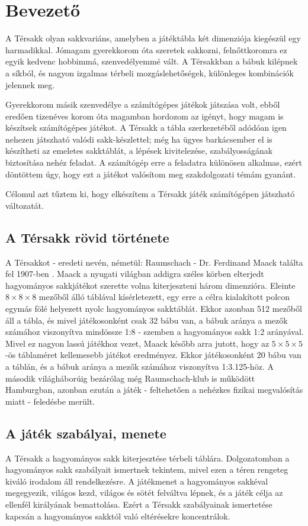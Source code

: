\documentclass[12pt, twoside]{report}
\begin{document}
\tableofcontents

\chapter{Bevezető}

A Térsakk olyan sakkvariáns, amelyben a játéktábla két dimenziója kiegészül egy harmadikkal. Jómagam gyerekkorom óta szeretek sakkozni, felnőttkoromra ez egyik kedvenc hobbimmá, szenvedélyemmé vált. A Térsakkban a bábuk kilépnek a síkból, és nagyon izgalmas térbeli mozgáslehetőségek, különleges kombinációk jelennek meg. 

Gyerekkorom másik szenvedélye a számítógépes játékok játszása volt, ebből eredően tizenéves korom óta magamban hordozom az igényt, hogy magam is készítsek számítógépes játékot. A Térsakk a tábla szerkezetéből adódóan igen nehezen játszható valódi sakk-készlettel; még ha ügyes barkácsember el is készítheti az emeletes sakktáblát, a lépések kivitelezése, szabályosságának biztosítása nehéz feladat. A számítógép erre a feladatra különösen alkalmas, ezért döntöttem úgy, hogy ezt a játékot valósítom meg szakdolgozati témám gyanánt.

Célomul azt tűztem ki, hogy elkészítem a Térsakk játék számítógépen játszható változatát. 

\section{A Térsakk rövid története}
A Térsakkot - eredeti nevén, németül: Raumschach - Dr. Ferdinand Maack találta fel 1907-ben  \cite{chessvariants}. Maack a nyugati világban addigra széles körben elterjedt hagyományos sakkjátékot szerette volna kiterjeszteni három dimenzióra. Eleinte $ 8 \times 8 \times 8 $ mezőből álló táblával kísérletezett, egy erre a célra kialakított polcon egymás fölé helyezett nyolc hagyományos sakktáblát. Ekkor azonban 512 mezőből áll a tábla, és mivel játékosonként csak 32 bábu van, a bábuk aránya a mezők számához viszonyítva mindössze 1:8 - szemben a hagyományos sakk 1:2 arányával. Mivel ez nagyon lassú játékhoz vezet, Maack később arra jutott, hogy az $ 5 \times 5 \times 5 $-ös táblaméret kellemesebb játékot eredményez. Ekkor játékosonként 20 bábu van a táblán, és a bábuk aránya a mezők számához viszonyítva 1:3.125-höz. A második világháborúig bezárólag még Raumschach-klub is működött Hamburgban, azonban ezután a játék - feltehetően a nehézkes fizikai megvalósítás miatt - feledésbe merült.

\section{A játék szabályai, menete}
A Térsakk a hagyományos sakk kiterjesztése térbeli táblára. Dolgozatomban a hagyományos sakk szabályait ismertnek tekintem, mivel ezen a téren rengeteg kiváló irodalom áll rendelkezésre. A játékmenet a hagyományos sakkéval megegyezik, világos kezd, világos és sötét felváltva lépnek, és a játék célja az ellenfél királyának bemattolása. Ezért a Térsakk szabályainak ismertetése kapcsán a hagyományos sakktól való eltérésekre koncentrálok.
\end{document}
